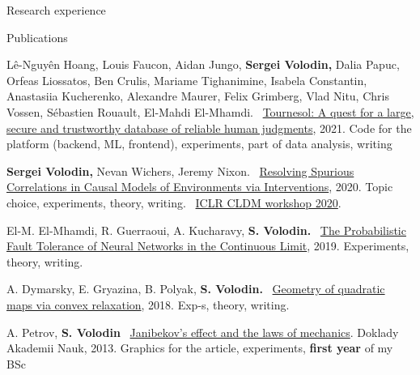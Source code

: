 \documentclass{resume} %
\newcommand*{\logo}[1]{%
	\raisebox{-.02\baselineskip}{%
		\texttt{[image: ./img/\#1]}%
	}%
}
\newcommand{\mylink}{{\color{gray}\faExternalLink}}
\begin{document}
\begin{rSection}{Research experience}
\end{rSection}



\begin{rSection}{Publications}
\vspace{-1em}
\item L\^{e}-Nguy\^{e}n Hoang, Louis Faucon, Aidan Jungo, {\bf Sergei Volodin,} Dalia Papuc, Orfeas Liossatos, Ben Crulis, Mariame Tighanimine, Isabela Constantin, Anastasiia Kucherenko, Alexandre Maurer, Felix Grimberg, Vlad Nitu, Chris Vossen, Sébastien Rouault, El-Mahdi El-Mhamdi. \mylink~\href{https://arxiv.org/abs/2107.07334}{Tournesol: A quest for a large, secure and trustworthy database of reliable human judgments}, 2021. Code for the platform (backend, ML, frontend), experiments, part of data analysis, writing
\item \logo{iclr.png} {\bf Sergei Volodin,} Nevan Wichers, Jeremy Nixon. \mylink~\href{https://arxiv.org/abs/2002.05217}{Resolving Spurious Correlations in Causal Models of Environments via Interventions}, 2020. Topic choice, experiments, theory, writing. \mylink~\href{https://causalrlworkshop.github.io/program/cldm_8.html}{ICLR CLDM workshop 2020}.
\item El-M. El-Mhamdi, R. Guerraoui, A. Kucharavy, {\bf \color{grayheading} S. Volodin.} \mylink~\href{https://arxiv.org/abs/1902.01686}{The Probabilistic Fault Tolerance of Neural Networks in the Continuous Limit}, 2019. Experiments, theory,  writing. %
\item A. Dymarsky, E. Gryazina, B. Polyak, {\bf \color{grayheading} S. Volodin.} \mylink~\href{https://arxiv.org/abs/1810.00896}{Geometry of quadratic maps via convex relaxation}, 2018. Exp-s, theory, writing.%
\item A. Petrov, {\bf \color{grayheading} S. Volodin} \mylink~\href{https://link.springer.com/article/10.1134/S1028335813080041}{Janibekov's effect and the laws of mechanics}. Doklady Akademii Nauk, 2013. Graphics for the article, experiments, {\bf first year} of my BSc
\end{rSection}
\end{document}
